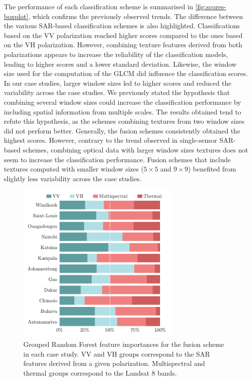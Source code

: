 \documentclass[remotesensing,article,submit,moreauthors,pdftex,10pt,a4paper]{Definitions/mdpi}
\begin{document}
The performance of each classification scheme is summarised in
\autoref{fig:scores-boxplot}, which confirms the previously observed trends. The
difference between the various SAR-based classification schemes is also
highlighted. Classifications based on the VV polarization reached higher scores
compared to the ones based on the VH polarization. However, combining texture
features derived from both polarizations appears to increase the reliability of
the classification models, leading to higher scores and a lower standard
deviation. Likewise, the window size used for the computation of the GLCM did
influence the classification scores. In our case studies, larger window sizes
led to higher scores and reduced the variability across the case studies. We
previously stated the hypothesis that combining several window sizes could
increase the classification performance by including spatial information from
multiple scales. The results obtained tend to refute this hypothesis, as the
schemes combining textures from two window sizes did not perform better.
Generally, the fusion schemes consistently obtained the highest scores. However,
contrary to the trend observed in single-sensor SAR-based schemes, combining
optical data with larger window sizes textures does not seem to increase the
classification performance. Fusion schemes that include textures computed with
smaller window sizes (\(5 \times 5\) and \(9 \times 9\)) benefited from slightly
less variability across the case studies.

\begin{figure}[H]
    \centering
    \includegraphics[width=8cm]{figures/feature_importances.pdf}
    \caption{Grouped Random Forest feature importances for the fusion scheme
    in each case study. VV and VH groups correspond to the SAR features
    derived from a given polarization. Multispectral and thermal groups
    correspond to the Landsat 8 bands.}
    \label{fig:feature-importances}
\end{figure}
\end{document}
